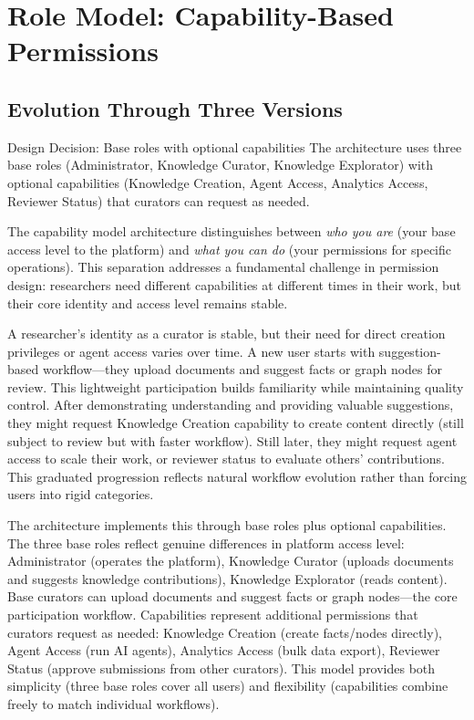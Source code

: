 \documentclass[12pt,a4paper]{article}
\begin{document}
\section{Role Model: Capability-Based Permissions}

\subsection{Evolution Through Three Versions}

\begin{rationale}{Design Decision: Base roles with optional capabilities}
The architecture uses three base roles (Administrator, Knowledge Curator, Knowledge Explorator) with optional capabilities (Knowledge Creation, Agent Access, Analytics Access, Reviewer Status) that curators can request as needed.
\end{rationale}

The capability model architecture distinguishes between \textit{who you are} (your base access level to the platform) and \textit{what you can do} (your permissions for specific operations). This separation addresses a fundamental challenge in permission design: researchers need different capabilities at different times in their work, but their core identity and access level remains stable.

A researcher's identity as a curator is stable, but their need for direct creation privileges or agent access varies over time. A new user starts with suggestion-based workflow—they upload documents and suggest facts or graph nodes for review. This lightweight participation builds familiarity while maintaining quality control. After demonstrating understanding and providing valuable suggestions, they might request Knowledge Creation capability to create content directly (still subject to review but with faster workflow). Still later, they might request agent access to scale their work, or reviewer status to evaluate others' contributions. This graduated progression reflects natural workflow evolution rather than forcing users into rigid categories.

The architecture implements this through base roles plus optional capabilities. The three base roles reflect genuine differences in platform access level: Administrator (operates the platform), Knowledge Curator (uploads documents and suggests knowledge contributions), Knowledge Explorator (reads content). Base curators can upload documents and suggest facts or graph nodes—the core participation workflow. Capabilities represent additional permissions that curators request as needed: Knowledge Creation (create facts/nodes directly), Agent Access (run AI agents), Analytics Access (bulk data export), Reviewer Status (approve submissions from other curators). This model provides both simplicity (three base roles cover all users) and flexibility (capabilities combine freely to match individual workflows).
\end{document}
